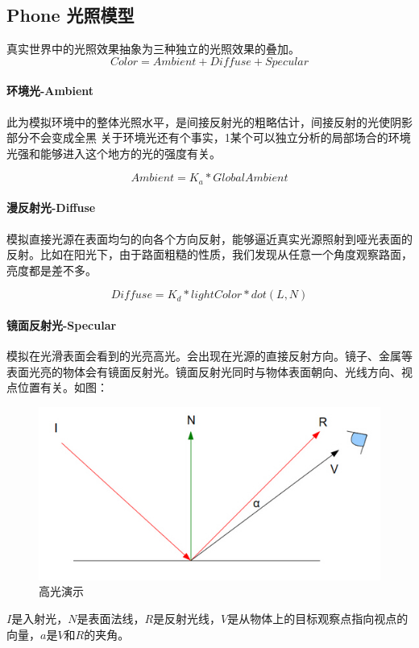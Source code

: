 \documentclass[UTF8,a4paper,12pt]{ctexbook}
\begin{document}
		\subsection{Phone 光照模型}
			真实世界中的光照效果抽象为三种独立的光照效果的叠加。
				$$Color = Ambient + Diffuse + Specular$$
			
			\paragraph{环境光-Ambient}
				此为模拟环境中的整体光照水平，是间接反射光的粗略估计，间接反射的光使阴影部分不会变成全黑 关于环境光还有个事实，1某个可以独立分析的局部场合的环境光强和能够进入这个地方的光的强度有关。 
					
					$$Ambient = K_a * GlobalAmbient $$
					
			\paragraph{漫反射光-Diffuse}
				模拟直接光源在表面均匀的向各个方向反射，能够逼近真实光源照射到哑光表面的反射。比如在阳光下，由于路面粗糙的性质，我们发现从任意一个角度观察路面，亮度都是差不多。 
				
					$$Diffuse = K_d * lightColor * dot(L,N) $$
			\paragraph{镜面反射光-Specular}
				模拟在光滑表面会看到的光亮高光。会出现在光源的直接反射方向。镜子、金属等表面光亮的物体会有镜面反射光。镜面反射光同时与物体表面朝向、光线方向、视点位置有关。如图：
					\begin{figure}[H]
						\centering
						\includegraphics[scale=0.8]{Specular}
						\caption{高光演示}
					\end{figure}
				
				$I$是入射光，$N$是表面法线，$R$是反射光线，$V$是从物体上的目标观察点指向视点的向量，$a$是$V$和$R$的夹角。
				
\end{document}
